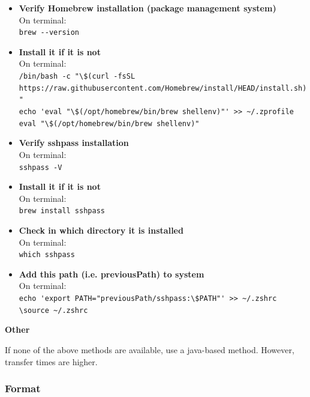 \documentclass{article}
\begin{document}
\begin{itemize}
    \item  \textbf{Verify Homebrew installation (package management system)}\\
    On terminal:\\
    \verb|brew --version|
    \item \textbf{Install it if it is not}\\
    On terminal:\\ 
    \verb|/bin/bash -c "\$(curl -fsSL https://raw.githubusercontent.com/Homebrew/install/HEAD/install.sh)"|\\
    \verb|echo 'eval "\$(/opt/homebrew/bin/brew shellenv)"' >> ~/.zprofile|\\
    \verb|eval "\$(/opt/homebrew/bin/brew shellenv)"|
    \item  \textbf{Verify sshpass installation}\\
    On terminal:\\
    \verb|sshpass -V|
    \item \textbf{Install it if it is not}\\
    On terminal:\\ 
    \verb|brew install sshpass|
    \item \textbf{Check in which directory it is installed}\\
    On terminal:\\
    \verb|which sshpass|\\
    \item \textbf{Add this path (i.e. previousPath) to system}\\
    On terminal:\\
    \verb|echo 'export PATH="previousPath/sshpass:\$PATH"' >> ~/.zshrc|\\
    \verb|\source ~/.zshrc|
\end{itemize}

\textbf{Other} \newline

If none of the above methods are available, use a java-based method. However, transfer times are higher.

\subsubsection{Format}
\end{document}
